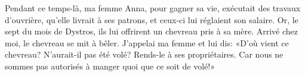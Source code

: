 Pendant ce temps-là, ma femme Anna, pour gagner sa vie, exécutait des travaux d’ouvrière,
	qu’elle livrait à ses patrons, et ceux-ci lui réglaient son salaire.
Or, le sept du mois de Dystros, ils lui offrirent un chevreau pris à sa mère.
Arrivé chez moi, le chevreau se mit à bêler.
J’appelai ma femme et lui dis: «D’où vient ce chevreau?
N’aurait-il pas été volé?
Rends-le à ses propriétaires.
	Car nous ne sommes pas autorisés à manger quoi que ce soit de volé!»

